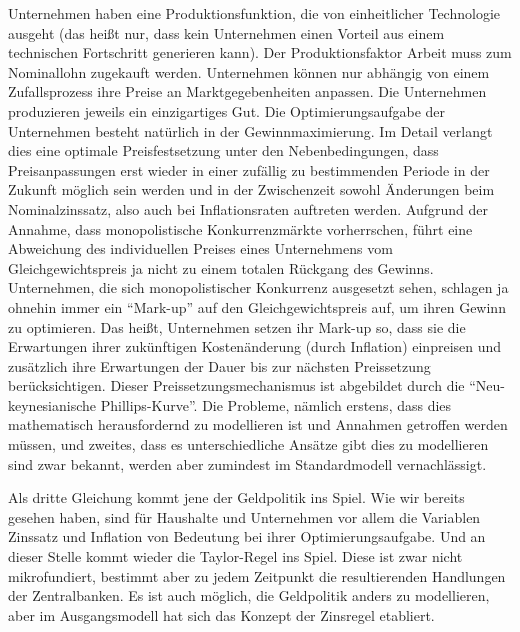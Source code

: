 Unternehmen haben eine Produktionsfunktion, die von einheitlicher Technologie ausgeht (das heißt nur, dass kein Unternehmen einen Vorteil aus einem technischen Fortschritt generieren kann). Der Produktionsfaktor Arbeit muss zum Nominallohn zugekauft werden. Unternehmen können nur abhängig von einem Zufallsprozess ihre Preise an Marktgegebenheiten anpassen. Die Unternehmen produzieren jeweils ein einzigartiges Gut. Die Optimierungsaufgabe der Unternehmen besteht natürlich in der Gewinnmaximierung. Im Detail verlangt dies eine optimale Preisfestsetzung unter den Nebenbedingungen, dass Preisanpassungen erst wieder in einer zufällig zu bestimmenden Periode in der Zukunft möglich sein werden und in der Zwischenzeit sowohl Änderungen beim Nominalzinssatz, also auch bei Inflationsraten auftreten werden. Aufgrund der Annahme, dass monopolistische Konkurrenzmärkte vorherrschen, führt eine Abweichung des individuellen Preises eines Unternehmens vom Gleichgewichtspreis ja nicht zu einem totalen Rückgang des Gewinns. Unternehmen, die sich monopolistischer Konkurrenz ausgesetzt sehen, schlagen ja ohnehin immer ein "`Mark-up"' auf den Gleichgewichtspreis auf, um ihren Gewinn zu optimieren. Das heißt, Unternehmen setzen ihr Mark-up so, dass sie die Erwartungen ihrer zukünftigen Kostenänderung (durch Inflation) einpreisen und zusätzlich ihre Erwartungen der Dauer bis zur nächsten Preissetzung berücksichtigen. Dieser Preissetzungsmechanismus ist abgebildet durch die "`Neu-keynesianische Phillips-Kurve"'. Die Probleme, nämlich erstens, dass dies mathematisch herausfordernd zu modellieren ist und Annahmen getroffen werden müssen, und zweites, dass es unterschiedliche Ansätze gibt dies zu modellieren sind zwar bekannt, werden aber zumindest im Standardmodell vernachlässigt.

Als dritte Gleichung kommt jene der Geldpolitik ins Spiel. Wie wir bereits gesehen haben, sind für Haushalte und Unternehmen vor allem die Variablen Zinssatz und Inflation von Bedeutung bei ihrer Optimierungsaufgabe. Und an dieser Stelle kommt wieder die Taylor-Regel\parencite{Taylor1993} ins Spiel. Diese ist zwar nicht mikrofundiert, bestimmt aber zu jedem Zeitpunkt die resultierenden Handlungen der Zentralbanken. Es ist auch möglich, die Geldpolitik anders zu modellieren, aber im Ausgangsmodell hat sich das Konzept der Zinsregel etabliert. 

